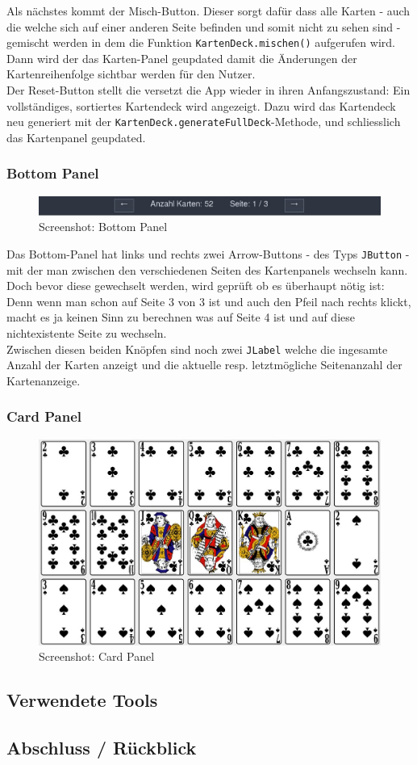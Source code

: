 \documentclass[a4paper,11pt]{article}
\begin{document}
Als nächstes kommt der Misch-Button. Dieser sorgt dafür dass alle Karten - auch die welche sich auf einer anderen Seite befinden und somit nicht zu sehen sind - gemischt werden in dem die Funktion \texttt{KartenDeck.mischen()} aufgerufen wird. Dann wird der das Karten-Panel geupdated damit die Änderungen der Kartenreihenfolge sichtbar werden für den Nutzer.\\

Der Reset-Button stellt die versetzt die App wieder in ihren Anfangszustand: Ein vollständiges, sortiertes Kartendeck wird angezeigt. Dazu wird das Kartendeck neu generiert mit der \texttt{KartenDeck.generateFullDeck}-Methode, und schliesslich das Kartenpanel geupdated.

\subsubsection{Bottom Panel}
\begin{figure}[H]
    \centering
    \includegraphics[width=.9\textwidth]{media/bottom-panel.jpg}
    \caption{Screenshot: Bottom Panel}
\end{figure}

Das Bottom-Panel hat links und rechts zwei Arrow-Buttons - des Typs \texttt{JButton} - mit der man zwischen den verschiedenen Seiten des Kartenpanels wechseln kann. Doch bevor diese gewechselt werden, wird geprüft ob es überhaupt nötig ist: Denn wenn man schon auf Seite 3 von 3 ist und auch den Pfeil nach rechts klickt, macht es ja keinen Sinn zu berechnen was auf Seite 4 ist und auf diese nichtexistente Seite zu wechseln.\\

Zwischen diesen beiden Knöpfen sind noch zwei \texttt{JLabel} welche die ingesamte Anzahl der Karten anzeigt und die aktuelle resp. letztmögliche Seitenanzahl der Kartenanzeige.

\subsubsection{Card Panel}
\begin{figure}[H]
    \centering
    \includegraphics[width=.9\textwidth]{media/card-panel.jpg}
    \caption{Screenshot: Card Panel}
\end{figure}

\subsection{Verwendete Tools}

\subsection{Abschluss / Rückblick}
\end{document}
